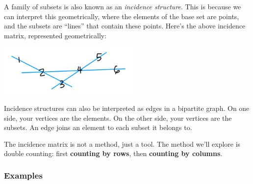 \documentclass[11pt,paper=letter]{scrartcl}
\begin{document}
A family of subsets is also known as an \textit{incidence structure}. This is because we can interpret this geometrically, where the elements of the base set are points, and the subsets are ``lines'' that contain these points. Here's the above incidence matrix, represented geometrically:

\begin{center}
  \includegraphics[height=1in]{1.png}
\end{center}

Incidence structures can also be interpreted as edges in a bipartite graph. On one side, your vertices are the elements. On the other side, your vertices are the subsets. An edge joins an element to each subset it belongs to.

The incidence matrix is not a method, just a tool. The method we'll explore is double counting: first {\bfseries \color{RowBlue} counting by rows}, then {\bfseries \color{ColOrange} counting by columns}.

\subsubsection*{Examples}
\end{document}
